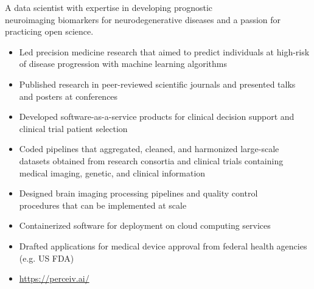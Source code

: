 \documentclass[10pt,a4paper,ragged2e,withhyper]{altacv}
\begin{document}

\makecvheader



\begin{paracol}{2}


A data scientist with expertise in developing prognostic \\neuroimaging biomarkers for neurodegenerative diseases and a passion for practicing open science.
\smallskip



\begin{itemize}
    \item Led precision medicine research that aimed to predict individuals at high-risk of disease progression with machine learning algorithms
    \item Published research in peer-reviewed scientific journals and presented talks and posters at conferences
    \item Developed software-as-a-service products for clinical decision support and clinical trial patient selection
    \item Coded pipelines that aggregated, cleaned, and harmonized large-scale datasets obtained from research consortia and clinical trials containing medical imaging, genetic, and clinical information
    \item Designed brain imaging processing pipelines and quality control \\procedures that can be implemented at scale
    \item Containerized software for deployment on cloud computing services
    \item Drafted applications for medical device approval from federal health agencies (e.g. US FDA)
    \item \url{https://perceiv.ai/}
\end{itemize}


\end{paracol}
\end{document}
